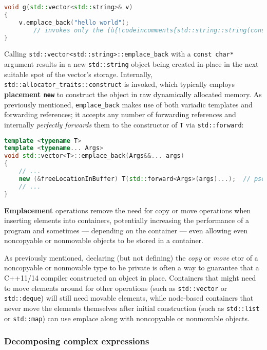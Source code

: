 \begin{lstlisting}[language=C++]
void g(std::vector<std::string>& v)
{
    v.emplace_back("hello world");
        // invokes only the (ù{\codeincomments{std::string::string(const char*)}}ù) constructor
}
\end{lstlisting}

\noindent Calling \texttt{std::vector<std::string>::emplace\_back} with a
\texttt{const}~\texttt{char*} argument results in a new
\texttt{std::string} object being created in-place in the next suitable
spot of the vector's storage. Internally,
\texttt{std::allocator\_traits::construct} is invoked, which typically
employs \textbf{placement \texttt{new}} to construct the object in raw
dynamically allocated memory. As previously mentioned,
\texttt{emplace\_back} makes use of both variadic
templates and forwarding references; it accepts any
number of forwarding references and internally \textit{perfectly forwards} them
to the constructor of \texttt{T} via \texttt{std::forward}:

\begin{lstlisting}[language=C++]
template <typename T>
template <typename... Args>
void std::vector<T>::emplace_back(Args&&... args)
{
    // ...
    new (&freeLocationInBuffer) T(std::forward<Args>(args)...);  // pseudocode
    // ...
}
\end{lstlisting}

\noindent \textbf{Emplacement} operations remove the need for copy or move
operations when inserting elements into containers, potentially
increasing the performance of a program and sometimes --- depending on the
container --- even allowing even noncopyable or nonmovable objects to be stored
in a container.

As previously mentioned,
declaring (but not defining) the \emph{copy} or \emph{move} ctor of a
noncopyable or nonmovable type to be private is often a way to guarantee that
a C++11/14 compiler constructed an object in place.
Containers that might need to move elements around for other operations
(such as \texttt{std::vector} or \texttt{std::deque}) will still need
movable elements, while node-based containers that never move the
elements themselves after initial construction (such as
\texttt{std::list} or \texttt{std::map}) can use emplace along with
noncopyable or nonmovable objects.

\subsubsection[Decomposing complex expressions]{Decomposing complex expressions}\label{decomposing-complex-expressions}

